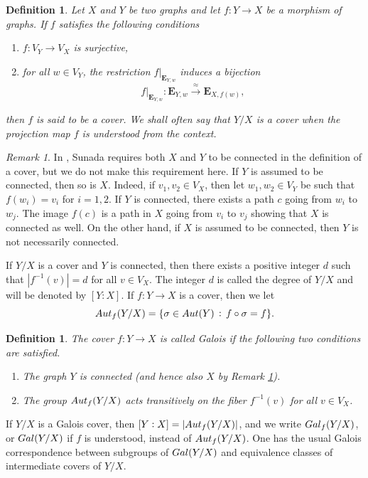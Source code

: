 \documentclass[11pt]{amsart}
\newtheorem{definition}[theorem]{Definition}
\numberwithin{equation}{section}
\theoremstyle{remark}
\newtheorem{remark}[theorem]{Remark}
\begin{document}
\begin{definition} \label{cover}
Let $X$ and $Y$ be two graphs and let $f:Y\rightarrow X$ be a morphism of graphs. If $f$ satisfies the following conditions
\begin{enumerate}
\item $f:V_{Y} \rightarrow V_{X}$ is surjective,
\item for all $w \in V_{Y}$, the restriction $f|_{\mathbf{E}_{Y,w}}$ induces a bijection 
$$f|_{\mathbf{E}_{Y,w}}:\mathbf{E}_{Y,w} \stackrel{\approx}{\rightarrow}{\mathbf{E}_{X,f(w)}}, $$
\end{enumerate}
then $f$ is said to be a cover. We shall often say that $Y/X$ is a cover when the projection map $f$ is understood from the context.  
\end{definition}
\begin{remark} \label{con_cover}
In \cite[Section 5.1]{Sunada:2013}, Sunada requires both $X$ and $Y$ to be connected in the definition of a cover, but we do not make this requirement here.  If $Y$ is assumed to be connected, then so is $X$.  Indeed, if $v_{1}, v_{2} \in V_{X}$, then let $w_{1}, w_{2} \in V_{Y}$ be such that $f(w_{i}) = v_{i}$ for $i=1,2$.  If $Y$ is connected, there exists a path $c$ going from $w_{i}$ to $w_{j}$.  The image $f(c)$ is a path in $X$ going from $v_{i}$ to $v_{j}$ showing that $X$ is connected as well.  On the other hand, if $X$ is assumed to be connected, then $Y$ is not necessarily connected.
\end{remark}
If $Y/X$ is a cover and $Y$ is connected, then there exists a positive integer $d$ such that $|f^{-1}(v)| = d$ for all $v \in V_{X}$.  The integer $d$ is called the degree of $Y/X$ and will be denoted by $[Y:X]$.  If $f:Y \rightarrow X$ is a cover, then we let
$${\rm Aut}_{f}(Y/X) = \{ \sigma \in {\rm Aut}(Y) \, : \, f \circ \sigma = f\}. $$
\begin{definition}
The cover $f:Y \rightarrow X$ is called Galois if the following two conditions are satisfied.
\begin{enumerate}
\item The graph $Y$ is connected (and hence also $X$ by Remark \ref{con_cover}).
\item The group ${\rm Aut}_{f}(Y/X)$ acts transitively on the fiber $f^{-1}(v)$ for all $v \in V_{X}$.
\end{enumerate}
\end{definition}
If $Y/X$ is a Galois cover, then $[Y:X] = |{\rm Aut}_{f}(Y/X)|$, and we write ${\rm Gal}_{f}(Y/X)$, or ${\rm Gal}(Y/X)$ if $f$ is understood, instead of ${\rm Aut}_{f}(Y/X)$.  One has the usual Galois correspondence between subgroups of ${\rm Gal}(Y/X)$ and equivalence classes of intermediate covers of $Y/X$.
\end{document}
